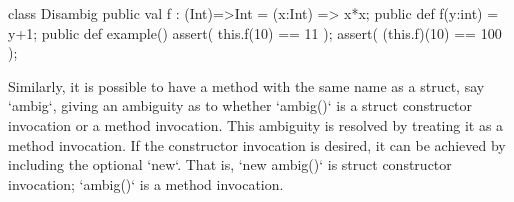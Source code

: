 \begin{ex}

\begin{xten}
class Disambig {
  public val f : (Int)=>Int =  (x:Int) => x*x;
  public def f(y:int) = y+1;
  public def example() {
      assert(  this.f(10)  == 11  );
      assert( (this.f)(10) == 100 );
  }
}
\end{xten}
%

\end{ex}

Similarly, it is possible to have a method with the same name as a struct, say
\xcd`ambig`, giving an ambiguity as to whether \xcd`ambig()` is a struct
constructor invocation or a method invocation.  This ambiguity is resolved by
treating it as a method invocation.  If the constructor invocation is desired,
it can be achieved by including the optional \xcd`new`.  That is, 
\xcd`new ambig()` is struct constructor invocation; \xcd`ambig()` is a 
method invocation.
